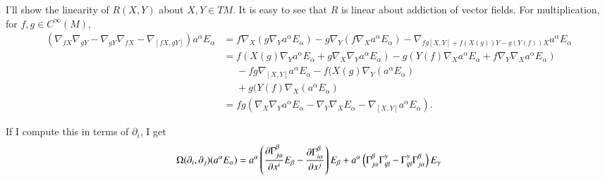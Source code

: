 \documentclass[a4paper, 12pt]{article}
\theoremstyle{Mydefinition}
\theoremstyle{Mytheorem}
\begin{document}
I'll show the linearity of $R(X,Y)$ about $X,Y\in TM$. It is easy to see that $R$ is linear about addiction of vector fields. For multiplication, for $f,g\in C^\infty(M)$,
\begin{equation*}
    \begin{split}
        \left(\nabla_{fX}\nabla_{gY}-\nabla_{gY}\nabla_{fX}-\nabla_{[fX,gY]}\right)a^\alpha E_\alpha &= f\nabla_X (g\nabla_Y a^\alpha E_\alpha) - g\nabla_Y (f\nabla_X a^\alpha E_\alpha) - \nabla_{fg[X,Y]+f(X(g))Y-g(Y(f))X}a^\alpha E_\alpha \\
        &=f(X(g)\nabla_Y a^\alpha E_\alpha + g\nabla_X\nabla_Ya^\alpha E_\alpha) -g(Y(f)\nabla_X a^\alpha E_\alpha + f\nabla_Y\nabla_Xa^\alpha E_\alpha) \\
        &\phantom{=} - fg\nabla_{[X,Y]}a^\alpha E_\alpha - f(X(g)\nabla_Y(a^\alpha E_\alpha)\\
        &\phantom{=}+ g(Y(f)\nabla_X(a^\alpha E_\alpha)\\
        &=fg(\nabla_X\nabla_Y a^\alpha E_\alpha - \nabla_Y\nabla_X E_\alpha - \nabla_{[X,Y]}a^\alpha E_\alpha).
    \end{split}
\end{equation*}

If I compute this in terms of $\partial_i$, I get
\begin{equation}\label{Eq:5_1}
    \Omega(\partial_i, \partial_j)(a^\alpha E_\alpha) = a^\alpha \left(\pdv{\Gamma_{j\alpha}^\beta}{x^i} E_\beta - \pdv{\Gamma_{i\alpha}^\beta}{x^j} \right)E_\beta + a^\alpha\left(\Gamma_{j\alpha}^\beta\Gamma_{i\beta}^\gamma - \Gamma_{i\beta}^\gamma\Gamma_{j\alpha}^\beta\right)E_\gamma
\end{equation}


\end{document}
